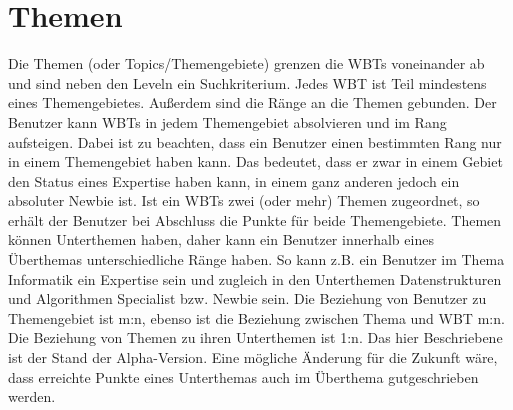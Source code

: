 \section{Themen}
Die Themen (oder Topics/Themengebiete) grenzen die WBTs voneinander ab und sind
neben den Leveln ein Suchkriterium. Jedes WBT ist Teil mindestens eines
Themengebietes. Außerdem sind die Ränge an die Themen gebunden. Der Benutzer
kann WBTs in jedem Themengebiet absolvieren und im Rang aufsteigen. Dabei ist zu
beachten, dass ein Benutzer einen bestimmten Rang nur in einem Themengebiet
haben kann. Das bedeutet, dass er zwar in einem Gebiet den Status eines
Expertise haben kann, in einem ganz anderen jedoch ein absoluter Newbie ist. Ist
ein WBTs zwei (oder mehr) Themen zugeordnet, so erhält der Benutzer bei
Abschluss die Punkte für beide Themengebiete. Themen können Unterthemen haben,
daher kann ein Benutzer innerhalb eines Überthemas unterschiedliche Ränge haben.
So kann z.B. ein Benutzer im Thema Informatik ein Expertise sein und zugleich in
den Unterthemen Datenstrukturen und Algorithmen Specialist bzw. Newbie sein.
Die Beziehung von Benutzer zu Themengebiet ist m:n, ebenso ist die Beziehung
zwischen Thema und WBT m:n. Die Beziehung von Themen zu ihren Unterthemen ist
1:n. Das hier Beschriebene ist der Stand der Alpha-Version. Eine mögliche
Änderung für die Zukunft wäre, dass erreichte Punkte eines Unterthemas auch im
Überthema gutgeschrieben werden.